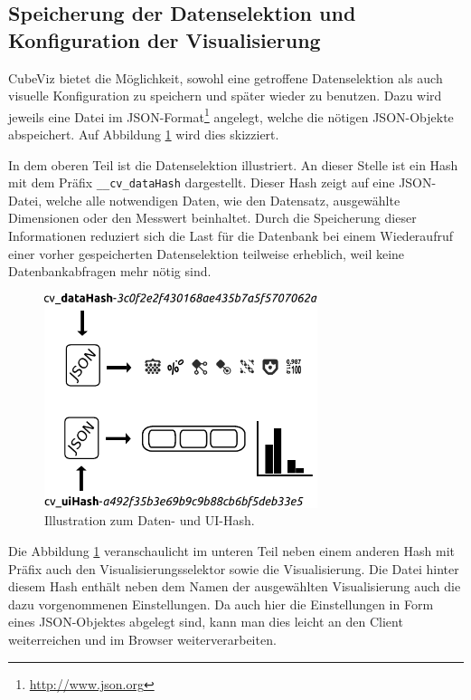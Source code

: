 \documentclass[11pt]{article}
\newcommand{\com}[1]{\marginpar{\em {\small{#1}}}} %
\begin{document}
%
%
\subsection{Speicherung der Datenselektion und Konfiguration der Visualisierung}
\label{sec:chapterCVDataUIHash}

CubeViz bietet die Möglichkeit, sowohl eine getroffene Datenselektion als auch visuelle Konfiguration zu speichern und später wieder zu benutzen. Dazu wird jeweils eine Datei im JSON-Format\footnote{\url{http://www.json.org}} angelegt, welche die nötigen JSON-Objekte abspeichert. Auf Abbildung \ref{fig:CubeViz_HashIllustration} wird dies skizziert.

In dem oberen Teil ist die Datenselektion\com{Daten-Hash} illustriert. An dieser Stelle ist ein Hash mit dem Präfix \verb|__cv_dataHash| dargestellt. Dieser Hash zeigt auf eine JSON-Datei, welche alle notwendigen Daten, wie den Datensatz, ausgewählte Dimensionen oder den Messwert beinhaltet. Durch die Speicherung dieser Informationen reduziert sich die Last für die Datenbank bei einem Wiederaufruf einer vorher gespeicherten Datenselektion teilweise erheblich, weil keine Datenbankabfragen mehr nötig sind. \\

%
%
\begin{figure}[h!]
    \centering
    \includegraphics[width=8cm]{CubeViz/HashIllustration.pdf}
    \caption{Illustration zum Daten- und UI-Hash.}
    \label{fig:CubeViz_HashIllustration}
\end{figure}

\noindent
Die Abbildung \ref{fig:CubeViz_HashIllustration} veranschaulicht im unteren Teil neben einem anderen Hash mit Präfix auch den Visualisierungsselektor sowie die Visualisierung. Die Datei hinter diesem Hash enthält neben dem Namen der ausgewählten Visualisierung auch die dazu vorgenommenen Einstellungen. Da auch hier die Einstellungen in Form eines JSON-Objektes abgelegt sind, kann man dies leicht an den Client weiterreichen und im Browser weiterverarbeiten.
\end{document}
